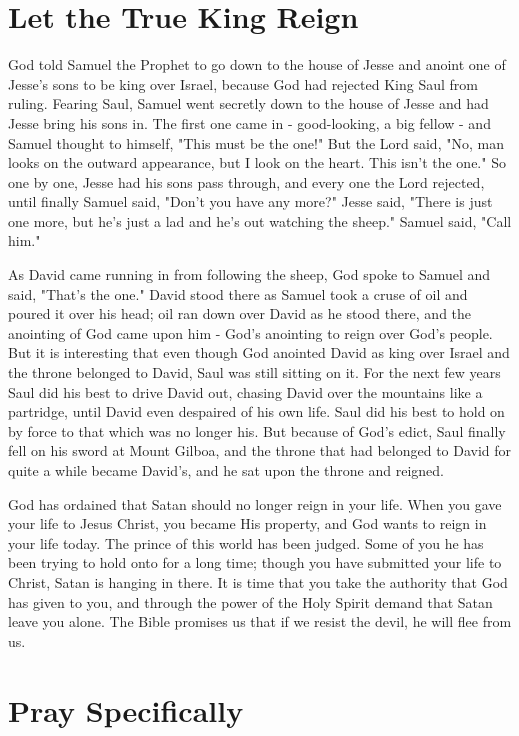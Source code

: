 \section*{Let the True King Reign}

God told Samuel the Prophet to go down to the house of Jesse and anoint one of Jesse's sons to be king over Israel, because God had rejected King Saul from ruling. Fearing Saul, Samuel went secretly down to the house of Jesse and had Jesse bring his sons in. The first one came in - good-looking, a big fellow - and Samuel thought to himself, "This must be the one!" But the Lord said, "No, man looks on the outward appearance, but I look on the heart. This isn't the one." So one by one, Jesse had his sons pass through, and every one the Lord rejected, until finally Samuel said, "Don't you have any more?" Jesse said, "There is just one more, but he's just a lad and he's out watching the sheep." Samuel said, "Call him." 

As David came running in from following the sheep, God spoke to Samuel and said, "That's the one." David stood there as Samuel took a cruse of oil and poured it over his head; oil ran down over David as he stood there, and the anointing of God came upon him - God's anointing to reign over God's people. But it is interesting that even though God anointed David as king over Israel and the throne belonged to David, Saul was still sitting on it. For the next few years Saul did his best to drive David out, chasing David over the mountains like a partridge, until David even despaired of his own life. Saul did his best to hold on by force to that which was no longer his. But because of God's edict, Saul finally fell on his sword at Mount Gilboa, and the throne that had belonged to David for quite a while became David's, and he sat upon the throne and reigned. 

God has ordained that Satan should no longer reign in your life. When you gave your life to Jesus Christ, you became His property, and God wants to reign in your life today. The prince of this world has been judged. Some of you he has been trying to hold onto for a long time; though you have submitted your life to Christ, Satan is hanging in there. It is time that you take the authority that God has given to you, and through the power of the Holy Spirit demand that Satan leave you alone. The Bible promises us that if we resist the devil, he will flee from us. 

\section*{Pray Specifically}

